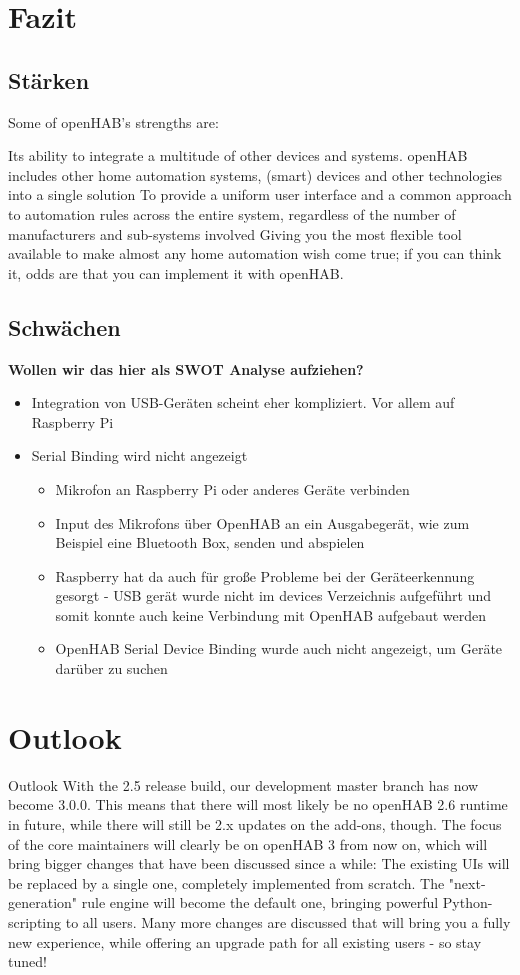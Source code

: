 \section{Fazit}
\subsection{Stärken}
Some of openHAB's strengths are:

Its ability to integrate a multitude of other devices and systems. openHAB includes other home automation systems, (smart) devices and other technologies into a single solution
To provide a uniform user interface and a common approach to automation rules across the entire system, regardless of the number of manufacturers and sub-systems involved
Giving you the most flexible tool available to make almost any home automation wish come true; if you can think it, odds are that you can implement it with openHAB.
\subsection{Schwächen}
\textbf{Wollen wir das hier als SWOT Analyse aufziehen?}
\begin{itemize}
	\item Integration von USB-Geräten scheint eher kompliziert. Vor allem auf Raspberry Pi
	\item Serial Binding wird nicht angezeigt
	\begin{itemize}
		\item Mikrofon an Raspberry Pi oder anderes Geräte verbinden
		\item Input des Mikrofons über OpenHAB an ein Ausgabegerät, wie zum Beispiel eine Bluetooth Box, senden und abspielen
		\item Raspberry hat da auch für große Probleme bei der Geräteerkennung gesorgt - USB gerät wurde nicht im devices Verzeichnis aufgeführt und somit konnte auch keine Verbindung mit OpenHAB aufgebaut werden
		\item OpenHAB Serial Device Binding wurde auch nicht angezeigt, um Geräte darüber zu suchen
	\end{itemize}
\end{itemize}

\section{Outlook}
Outlook
With the 2.5 release build, our development master branch has now become 3.0.0. This means that there will most likely be no openHAB 2.6 runtime in future, while there will still be 2.x updates on the add-ons, though. The focus of the core maintainers will clearly be on openHAB 3 from now on, which will bring bigger changes that have been discussed since a while: The existing UIs will be replaced by a single one, completely implemented from scratch. The "next-generation" rule engine will become the default one, bringing powerful Python-scripting to all users. Many more changes are discussed that will bring you a fully new experience, while offering an upgrade path for all existing users - so stay tuned!

